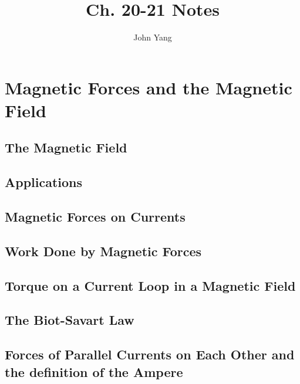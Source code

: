 \documentclass{article}
\title{Ch. 20-21 Notes}
\author{John Yang}
\begin{document}
\maketitle
\section{Magnetic Forces and the Magnetic Field}
\subsection{The Magnetic Field}
\begin{outline}
	\1 
\end{outline}
\subsection{Applications}
\begin{outline}
	\1 
\end{outline}
\subsection{Magnetic Forces on Currents}
\begin{outline}
	\1 
\end{outline}
\subsection{Work Done by Magnetic Forces}
\begin{outline}
	\1 
\end{outline}
\subsection{Torque on a Current Loop in a Magnetic Field}
\begin{outline}
	\1 
\end{outline}
\subsection{The Biot-Savart Law}
\begin{outline}
	\1 
\end{outline}
\subsection{Forces of Parallel Currents on Each Other and the definition of the Ampere}
\begin{outline}
	\1 
\end{outline}
\end{document}
